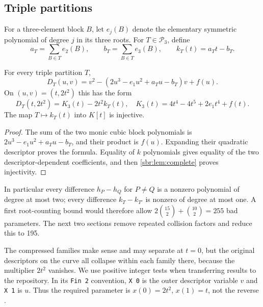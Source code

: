 \documentclass[11pt,letterpaper]{article}
\numberwithin{equation}{section}
\theoremstyle{definition}
\theoremstyle{remark}
\newcommand{\Pthree}{\mathcal P_3}
\newcommand{\src}[1]{\texttt{\nolinkurl{#1}}}
\begin{document}
\subsection{Triple partitions}

For a three-element block $B$, let $e_j(B)$ denote the elementary symmetric
polynomial of degree $j$ in its three roots. For $T\in\Pthree$, define
\begin{equation}
 a_T=\sum_{B\in T}e_2(B),\qquad
 b_T=\sum_{B\in T}e_3(B),\qquad
 k_T(t)=a_Tt-b_T.
 \label{sbr:eq:k}
\end{equation}

\begin{proposition}
\label{sbr:prop:triple-expansion}
For every triple partition $T$,
\begin{equation}
 D_T(u,v)=v^2-(2u^3-e_1u^2+a_Tu-b_T)v+f(u).
 \label{sbr:eq:triple-descriptor}
\end{equation}
On $(u,v)=(t,2t^2)$ this has the form
\begin{equation}
 D_T(t,2t^2)=K_3(t)-2t^2k_T(t),
 \quad K_3(t)=4t^4-4t^5+2e_1t^4+f(t).
 \label{sbr:eq:triple-curve}
\end{equation}
The map $T\mapsto k_T(t)$ into $K[t]$ is injective.
\end{proposition}
\begin{proof}
The sum of the two monic cubic block polynomials is
$2u^3-e_1u^2+a_Tu-b_T$, and their product is $f(u)$. Expanding their
quadratic descriptor proves the formula. Equality of $k$ polynomials gives
equality of the two descriptor-dependent coefficients, and then
\cref{sbr:lem:complete} proves injectivity.
\end{proof}

In particular every difference $h_P-h_Q$ for $P\ne Q$ is a nonzero
polynomial of degree at most two; every difference $k_T-k_{T'}$ is nonzero
of degree at most one. A first root-counting bound would therefore allow
$2\binom{15}{2}+\binom{10}{2}=255$ bad parameters. The next two sections
remove repeated collision factors and reduce this to 195.

\begin{remark}
\label{zpt:rem:sbr-zero}
The compressed families make sense and may separate at $t=0$, but the
original descriptors on the curve all collapse within each family there,
because the multiplier $2t^2$ vanishes. We use positive integer tests when
transferring results to the repository. In its \src{Fin 2} convention,
\src{X 0} is the outer descriptor variable $v$ and \src{X 1} is $u$.
Thus the required parameter is $x(0)=2t^2$, $x(1)=t$, not the reverse
\cite{repo-invariants}.
\end{remark}
\end{document}
